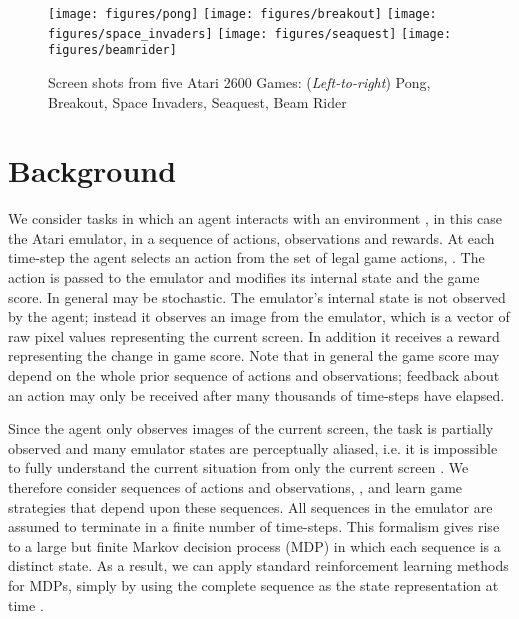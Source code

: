 \documentclass{article} \usepackage{nips13submit_e,times}
\begin{document}
\begin{figure}
\texttt{[image: figures/pong]}
\texttt{[image: figures/breakout]}
\texttt{[image: figures/space\_invaders]}
\texttt{[image: figures/seaquest]}
\texttt{[image: figures/beamrider]}
\caption{\label{fig-games} Screen shots from five Atari 2600 Games: (\emph{Left-to-right}) Pong, Breakout, Space Invaders, Seaquest, Beam Rider}
\end{figure}


























 
\section{Background}
\label{sec:background}


We consider tasks in which an agent interacts with an environment , in this case the Atari emulator, in a sequence of actions, observations and rewards. 
At each time-step the agent selects an action  from the set of legal game actions, . The action is passed to the emulator and modifies its internal state and the game score. In general  may be stochastic. The emulator's internal state is not observed by the agent; instead it observes an image  from the emulator, which is a vector of raw pixel values representing the current screen. In addition it receives a reward  representing the change in game score. Note that in general the game score may depend on the whole prior sequence of actions and observations; feedback about an action may only be received after many thousands of time-steps have elapsed. 

Since the agent only observes images of the current screen, the task is partially observed and many emulator states are perceptually aliased, i.e. it is impossible to fully understand the current situation from only the current screen . We therefore consider sequences of actions and observations, , and learn game strategies that depend upon these sequences. All sequences in the emulator are assumed to terminate in a finite number of time-steps. This formalism gives rise to a large but finite Markov decision process (MDP) in which each sequence is a distinct state. As a result, we can apply standard reinforcement learning methods for MDPs, simply by using the complete sequence  as the state representation at time .
\end{document}
